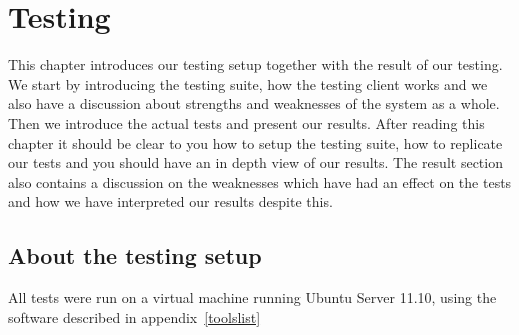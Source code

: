 \section{Testing}\label{Testing}
	This chapter introduces our testing setup together with the result of our testing. We start by introducing the testing suite, how the testing client works and we also have a discussion about strengths and weaknesses of the system as a whole. Then we introduce the actual tests and present our results. After reading this chapter it should be clear to you how to setup the testing suite, how to replicate our tests and you should have an in depth view of our results. The result section also contains a discussion on the weaknesses which have had an effect on the tests and how we have interpreted our results despite this.
	    
    \subsection{About the testing setup}\label{Testing:About}
        All tests were run on a virtual machine running Ubuntu Server 11.10, using the software described in appendix~\ref{toolslist}
    	
 		
    	
    	
	

    

